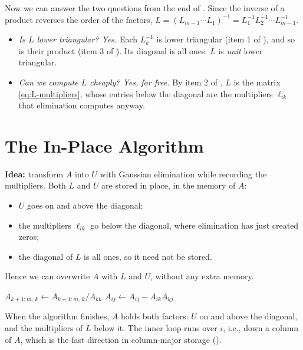 Now we can answer the two questions from the end of . Since the inverse of a product reverses the order of the factors, $L = (L_{m-1} \cdots L_1)^{-1} = L_1^{-1} L_2^{-1} \cdots L_{m-1}^{-1}$.
\begin{itemize}
  \item \emph{Is $L$ lower triangular? Yes.} Each $L_k^{-1}$ is lower triangular (item 1 of ), and so is their product (item 3 of ). Its diagonal is all ones: $L$ is \emph{unit} lower triangular.
  \item \emph{Can we compute $L$ cheaply? Yes, for free.} By item 2 of , $L$ is the matrix \eqref{eq:L-multipliers}, whose entries below the diagonal are the multipliers $\ell_{ik}$ that elimination computes anyway.
\end{itemize}

\section{The In-Place Algorithm}

\textbf{Idea:} transform $A$ into $U$ with Gaussian elimination while recording the multipliers. Both $L$ and $U$ are stored in place, in the memory of $A$:
\begin{itemize}
  \item $U$ goes on and above the diagonal;
  \item the multipliers $\ell_{ik}$ go below the diagonal, where elimination has just created zeros;
  \item the diagonal of $L$ is all ones, so it need not be stored.
\end{itemize}
Hence we can overwrite $A$ with $L$ and $U$, without any extra memory.

\begin{algorithm}[H]
  \caption{LU factorization without pivoting, in place.}
  \label{alg:lu}
  \begin{algorithmic}[1]
      \State $A_{k+1:m,\,k} \gets A_{k+1:m,\,k} / A_{kk}$ 
          \State $A_{ij} \gets A_{ij} - A_{ik}A_{kj}$ 
        \EndFor
      \EndFor
    \EndFor
  \end{algorithmic}
\end{algorithm}

When the algorithm finishes, $A$ holds both factors: $U$ on and above the diagonal, and the multipliers of $L$ below it. The inner loop runs over $i$, i.e., down a column of $A$, which is the fast direction in column-major storage ().


